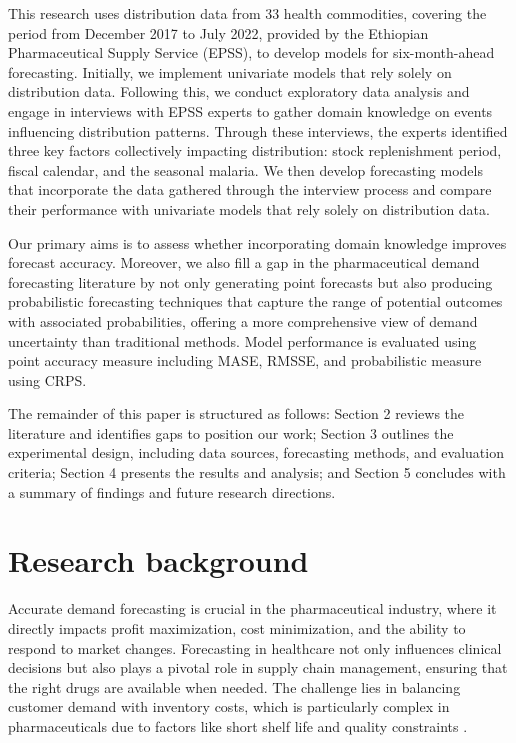 \documentclass[
  authoryear,
  preprint,
  3p]{elsarticle}
\begin{document}
This research uses distribution data from 33 health commodities,
covering the period from December 2017 to July 2022, provided by the
Ethiopian Pharmaceutical Supply Service (EPSS), to develop models for
six-month-ahead forecasting. Initially, we implement univariate models
that rely solely on distribution data. Following this, we conduct
exploratory data analysis and engage in interviews with EPSS experts to
gather domain knowledge on events influencing distribution patterns.
Through these interviews, the experts identified three key factors
collectively impacting distribution: stock replenishment period, fiscal
calendar, and the seasonal malaria. We then develop forecasting models
that incorporate the data gathered through the interview process and
compare their performance with univariate models that rely solely on
distribution data.

Our primary aims is to assess whether incorporating domain knowledge
improves forecast accuracy. Moreover, we also fill a gap in the
pharmaceutical demand forecasting literature by not only generating
point forecasts but also producing probabilistic forecasting techniques
that capture the range of potential outcomes with associated
probabilities, offering a more comprehensive view of demand uncertainty
than traditional methods. Model performance is evaluated using point
accuracy measure including MASE, RMSSE, and probabilistic measure using
CRPS.

The remainder of this paper is structured as follows: Section 2 reviews
the literature and identifies gaps to position our work; Section 3
outlines the experimental design, including data sources, forecasting
methods, and evaluation criteria; Section 4 presents the results and
analysis; and Section 5 concludes with a summary of findings and future
research directions.

\section{Research background}\label{sec-lit}

Accurate demand forecasting is crucial in the pharmaceutical industry,
where it directly impacts profit maximization, cost minimization, and
the ability to respond to market changes. Forecasting in healthcare not
only influences clinical decisions but also plays a pivotal role in
supply chain management, ensuring that the right drugs are available
when needed. The challenge lies in balancing customer demand with
inventory costs, which is particularly complex in pharmaceuticals due to
factors like short shelf life and quality constraints
\citep{gupta2000mid, makridakis2020forecasting}.
\end{document}
